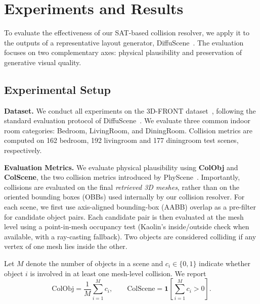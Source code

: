\section{Experiments and Results}
\label{sec:exp}

To evaluate the effectiveness of our SAT-based collision resolver, we apply it to the outputs of a representative layout generator, DiffuScene~\cite{tang2024diffuscenedenoisingdiffusionmodels}. The evaluation focuses on two complementary axes: physical plausibility and preservation of generative visual quality.

\subsection{Experimental Setup}
\label{sec:exp:setup}

\textbf{Dataset.}
We conduct all experiments on the 3D-FRONT dataset~\cite{fu20203dfuture3dfurnitureshape}, following the standard evaluation protocol of DiffuScene~\cite{tang2024diffuscenedenoisingdiffusionmodels}. We evaluate three common indoor room categories: Bedroom, LivingRoom, and DiningRoom. Collision metrics are computed on 162 bedroom, 192 livingroom and 177 diningroom test scenes, respectively.

\noindent\textbf{Evaluation Metrics.}
We evaluate physical plausibility using \textbf{ColObj} and \textbf{ColScene}, the two collision metrics introduced by PhyScene~\cite{yang2024physcenephysicallyinteractable3d}. Importantly, collisions are evaluated on the final \emph{retrieved 3D meshes}, rather than on the oriented bounding boxes (OBBs) used internally by our collision resolver.
For each scene, we first use axis-aligned bounding-box (AABB) overlap as a  pre-filter for candidate object pairs. Each candidate pair is then evaluated at the mesh level using a point-in-mesh occupancy test (Kaolin's inside/outside check \cite{KaolinLibrary} when available, with a ray-casting fallback). Two objects are considered colliding if any vertex of one mesh lies inside the other.

Let $M$ denote the number of objects in a scene and $c_i \in \{0,1\}$ indicate whether object $i$ is involved in at least one mesh-level collision. We report
\begin{equation}
    \mathrm{ColObj}
    = \frac{1}{M}\sum_{i=1}^{M} c_i,
    \qquad
    \mathrm{ColScene}
    = \mathbf{1}\!\left[\sum_{i=1}^{M} c_i > 0\right].
    \label{eq:colmetrics}
\end{equation}

